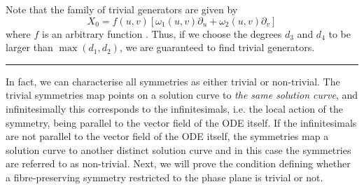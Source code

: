 \begin{remark}
  Note that the family of trivial generators are given by
  $$X_0=f(u,v)\left[\omega_1(u,v)\partial_u+\omega_2(u,v)\partial_v\right]$$
  where $f$ is an arbitrary function \cite{bluman1989symmetries}. Thus, if we choose the degrees $d_3$ and $d_4$ to be larger than $\max\left(d_1,d_2\right)$, we are guaranteed to find trivial generators.
\end{remark}
\hrule
  $\;$\\\noindent In fact, we can characterise all symmetries as either trivial or non-trivial. The trivial symmetries map points on a solution curve to \textit{the same solution curve}, and infinitesimally this corresponds to the infinitesimals, i.e. the local action of the symmetry, being parallel to the vector field of the ODE itself. If the infinitesimals are not parallel to the vector field of the ODE itself, the symmetries map a solution curve to another distinct solution curve and in this case the symmetries are referred to as non-trivial. Next, we will prove the condition defining whether a fibre-preserving symmetry restricted to the phase plane is trivial or not. 

